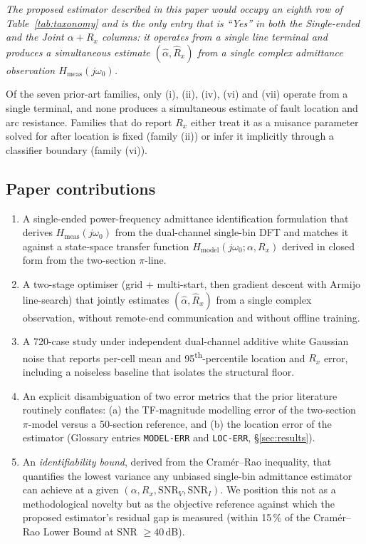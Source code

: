 \documentclass[journal]{IEEEtran}
\newcommand{\headlineCRLBGap}%
  {within 15\,\% of the Cram\'er--Rao Lower Bound at SNR $\geq 40$\,dB}
\begin{document}
\textit{The proposed estimator described in this paper would occupy an
eighth row of Table~\ref{tab:taxonomy} and is the only entry that is
``Yes'' in both the Single-ended and the Joint $\alpha\!+\!R_x$
columns: it operates from a single line terminal and produces a
simultaneous estimate $(\hat\alpha,\hat R_x)$ from a single complex
admittance observation $H_{\mathrm{meas}}(j\omega_0)$.}

Of the seven prior-art families, only (i), (ii), (iv), (vi) and (vii)
operate from a single terminal, and none produces a simultaneous
estimate of fault location and arc resistance.  Families that do
report $R_x$ either treat it as a nuisance parameter solved for after
location is fixed (family (ii)) or infer it implicitly through a
classifier boundary (family (vi)).

\subsection*{Paper contributions}
\begin{enumerate}
  \item A single-ended power-frequency admittance identification
        formulation that derives $H_{\mathrm{meas}}(j\omega_0)$ from
        the dual-channel single-bin DFT and matches it against a
        state-space transfer function $H_{\mathrm{model}}(j\omega_0;
        \alpha, R_x)$ derived in closed form from the two-section
        $\pi$-line.
  \item A two-stage optimiser (grid + multi-start, then gradient
        descent with Armijo line-search) that jointly estimates
        $(\hat\alpha,\hat R_x)$ from a single complex observation,
        without remote-end communication and without offline training.
  \item A 720-case study under independent dual-channel additive
        white Gaussian noise that reports per-cell mean and
        95\textsuperscript{th}-percentile location and $R_x$ error,
        including a noiseless baseline that isolates the structural
        floor.
  \item An explicit disambiguation of two error metrics that the
        prior literature routinely conflates:
        (a) the TF-magnitude modelling error of the two-section
        $\pi$-model versus a 50-section reference, and
        (b) the location error of the estimator
        (Glossary entries \texttt{MODEL-ERR} and \texttt{LOC-ERR},
        \S\ref{sec:results}).
  \item An \emph{identifiability bound}, derived from the
        Cram\'er--Rao inequality, that quantifies the lowest variance
        any unbiased single-bin admittance estimator can achieve at a
        given $(\alpha, R_x, \mathrm{SNR}_V, \mathrm{SNR}_I)$.  We
        position this not as a methodological novelty but as the
        objective reference against which the proposed estimator's
        residual gap is measured (\headlineCRLBGap).
\end{enumerate}
\end{document}
